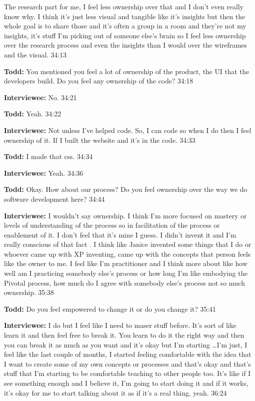 The research part for me, I feel less ownership over that and I don't even really know why.  I think it's just less visual and tangible like it's insights but then the whole goal is to share those and it's often a group in a room and they're not my insights, it's stuff I'm picking out of someone else's brain so I feel less ownership over the research process and even the insights than I would over the wireframes and the visual.  34:13

\textbf{Todd:} You mentioned you feel a lot of ownership of the product, the UI that the developers build.  Do you feel any ownership of the code?  34:18

\textbf{Interviewee:} No.  34:21

\textbf{Todd:} Yeah.  34:22

\textbf{Interviewee:} Not unless I've helped code.  So, I can code so when I do then I feel ownership of it.  If I built the website and it's in the code.  34:33

\textbf{Todd:} I made that css.  34:34

\textbf{Interviewee:} Yeah.  34:36

\textbf{Todd:} Okay.  How about our process?  Do you feel ownership over the way we do software development here?  34:44

\textbf{Interviewee:} I wouldn't say ownership.  I think I'm more focused on mastery or levels of understanding of the process so in facilitation of the process or enablement of it.  I don't feel that it's mine I guess.  I didn't invent it and I'm really conscious of that fact .  I think like Janice invented some things that I do or whoever came up with XP inventing, came up with the concepts that person feels like the owner to me.  I feel like I'm practitioner and I think more about like how well am I practicing somebody else's process or how long I'm like embodying the Pivotal process, how much do I agree with somebody else's process not so much ownership.  35:38

\textbf{Todd:} Do you feel empowered to change it or do you change it?  35:41

\textbf{Interviewee:} I do but I feel like I need to maser stuff before.  It's sort of like learn it and then feel free to break it.  You learn to do it the right way and then you can break it as much as you want and it's okay but I'm starting \ldots I'm just, I feel like the last couple of months, I started feeling comfortable with the idea that I want to create some of my own concepts or processes and that's okay and that's stuff that I'm starting to be comfortable teaching to other people too.  It's like if I see something enough and I believe it, I'm going to start doing it and if it works, it's okay for me to start talking about it as if it's a real thing, yeah.  36:24

